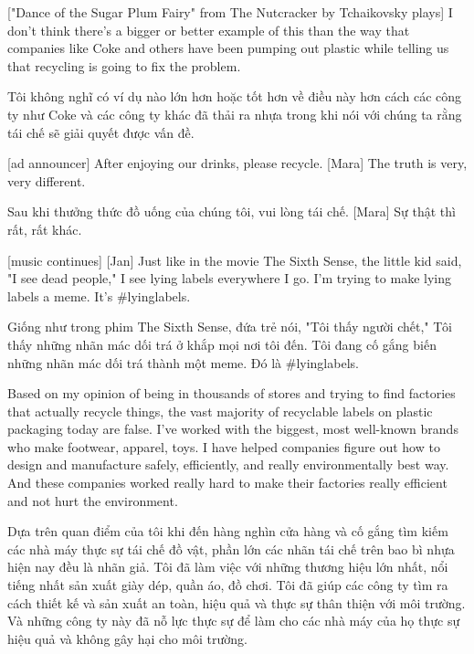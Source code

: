 \documentclass[a4paper]{article}
\begin{document}
	["Dance of the Sugar Plum Fairy" from The Nutcracker by Tchaikovsky plays]
	I don't think there's a bigger or better example of this than the way that companies like Coke and others have been pumping out plastic while telling us that recycling is going to fix the problem.
	
	\begin{vietnamese-v2}
		Tôi không nghĩ có ví dụ nào lớn hơn hoặc tốt hơn về điều này hơn cách các công ty như Coke và các công ty khác đã thải ra nhựa trong khi nói với chúng ta rằng tái chế sẽ giải quyết được vấn đề.
	\end{vietnamese-v2}
	
	[ad announcer] After enjoying our drinks, please recycle.
	[Mara] The truth is very, very different.
	
	\begin{vietnamese-v2}
		 Sau khi thưởng thức đồ uống của chúng tôi, vui lòng tái chế.
		[Mara] Sự thật thì rất, rất khác.	
	\end{vietnamese-v2}
	
	[music continues]
	[Jan] Just like in the movie The Sixth Sense, the little kid said, "I see dead people,"
	I see lying labels everywhere I go.
	I'm trying to make lying labels a meme.
	It's \#lyinglabels.
	
	\begin{vietnamese-v2}
		 Giống như trong phim The Sixth Sense, đứa trẻ nói, "Tôi thấy người chết,"
		Tôi thấy những nhãn mác dối trá ở khắp mọi nơi tôi đến.
		Tôi đang cố gắng biến những nhãn mác dối trá thành một meme.
		Đó là \#lyinglabels.
	\end{vietnamese-v2}
	
	Based on my opinion of being in thousands of stores and trying to find factories that actually recycle things, the vast majority of recyclable labels on plastic packaging today are false.
	I've worked with the biggest, most well-known brands who make footwear, apparel, toys.
	I have helped companies figure out how to design and manufacture safely, efficiently, and really environmentally best way.
	And these companies worked really hard to make their factories really efficient and not hurt the environment.
	
	\begin{vietnamese-v2}
		Dựa trên quan điểm của tôi khi đến hàng nghìn cửa hàng và cố gắng tìm kiếm các nhà máy thực sự tái chế đồ vật, phần lớn các nhãn tái chế trên bao bì nhựa hiện nay đều là nhãn giả.
		Tôi đã làm việc với những thương hiệu lớn nhất, nổi tiếng nhất sản xuất giày dép, quần áo, đồ chơi.
		Tôi đã giúp các công ty tìm ra cách thiết kế và sản xuất an toàn, hiệu quả và thực sự thân thiện với môi trường.
		Và những công ty này đã nỗ lực thực sự để làm cho các nhà máy của họ thực sự hiệu quả và không gây hại cho môi trường.
	\end{vietnamese-v2}
	
\end{document}
